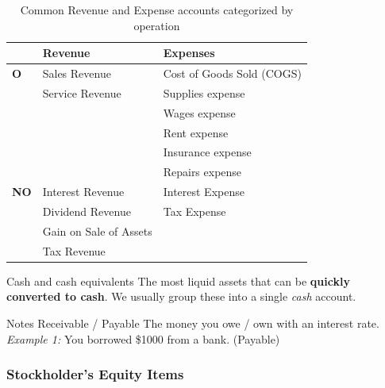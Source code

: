 \begin{table}[H]
    \centering
    \begin{tabular}{|l|p{}|p{}|}
        \hline
                    & \textbf{Revenue}       & \textbf{Expenses}         \\
        \hline
        \textbf{O}  & Sales Revenue          & Cost of Goods Sold (COGS) \\
                    & Service Revenue        & Supplies expense          \\
                    &                        & Wages expense             \\
                    &                        & Rent expense              \\
                    &                        & Insurance expense         \\
                    &                        & Repairs expense           \\
        \hline
        \textbf{NO} & Interest Revenue       & Interest Expense          \\
                    & Dividend Revenue       & Tax Expense               \\
                    & Gain on Sale of Assets &                           \\
                    & Tax Revenue            &                           \\
        \hline
    \end{tabular}
    \caption{Common Revenue and Expense accounts categorized by operation}
\end{table}

\begin{knBox}
    {Cash and cash equivalents}
    The most liquid assets that can be \textbf{quickly converted to cash}. We usually group these into a single \textit{cash} account.
\end{knBox}

\begin{knBox}
    {Notes Receivable / Payable}
    The money you owe / own with an interest rate.
    \tcblower
    \textit{Example 1: } You borrowed \$1000 from a bank. (Payable)
\end{knBox}
\label{def:nrp}

\subsubsection{Stockholder's Equity Items}

